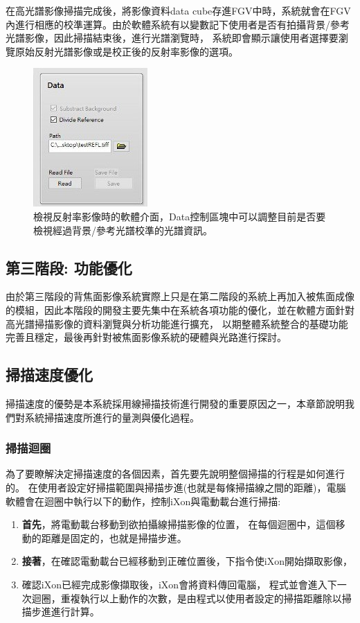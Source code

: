 \documentclass[12pt]{article}
\begin{document}
在高光譜影像掃描完成後，將影像資料data cube存進FGV中時，系統就會在FGV內進行相應的校準運算。由於軟體系統有以變數記下使用者是否有拍攝背景/參考光譜影像，因此掃描結束後，進行光譜瀏覽時，
系統即會顯示讓使用者選擇要瀏覽原始反射光譜影像或是校正後的反射率影像的選項。
\begin{figure}[ht]
    \centering
    \includegraphics[width=0.5\linewidth]{reflection.jpeg}
    \caption[檢視反射率影像時的軟體介面。]{檢視反射率影像時的軟體介面，Data控制區塊中可以調整目前是否要檢視經過背景/參考光譜校準的光譜資訊。}
    \label{figure: reflection}
\end{figure}

\subsection{第三階段: 功能優化}
由於第三階段的背焦面影像系統實際上只是在第二階段的系統上再加入被焦面成像的模組，因此本階段的開發主要先集中在系統各項功能的優化，並在軟體方面針對高光譜掃描影像的資料瀏覽與分析功能進行擴充，
以期整體系統整合的基礎功能完善且穩定，最後再針對被焦面影像系統的硬體與光路進行探討。

\subsection{掃描速度優化}
掃描速度的優勢是本系統採用線掃描技術進行開發的重要原因之一，本章節說明我們對系統掃描速度所進行的量測與優化過程。
\subsubsection{掃描迴圈}
為了要瞭解決定掃描速度的各個因素，首先要先說明整個掃描的行程是如何進行的。
在使用者設定好掃描範圍與掃描步進(也就是每條掃描線之間的距離)，電腦軟體會在迴圈中執行以下的動作，控制iXon與電動載台進行掃描:
\begin{enumerate}
    \item \textbf{首先}，將電動載台移動到欲拍攝線掃描影像的位置，
    在每個迴圈中，這個移動的距離是固定的，也就是掃描步進。
    \item \textbf{接著}，在確認電動載台已經移動到正確位置後，下指令使iXon開始擷取影像，
    \item 確認iXon已經完成影像擷取後，iXon會將資料傳回電腦，
    程式並會進入下一次迴圈，重複執行以上動作的次數，是由程式以使用者設定的掃描距離除以掃描步進進行計算。
\end{enumerate}
\end{document}
